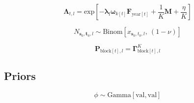 \documentclass{article}
\begin{document}

\begin{equation}
  \label{eq:model-survival}
    \boldsymbol{\Lambda}_{t,l} = 
      \mathrm{exp} \! \left[ -
      \boldsymbol{\lambda}_{l} \boldsymbol{\omega}_{k[t]}  
      \boldsymbol{F}_{\mathrm{year}[t]} + \frac{1}{K} \boldsymbol{M} + \frac{\eta}{K} \right]
\end{equation}


\begin{equation}
  \label{eq:model-release}
  N_{\boldsymbol{s}_{0},\boldsymbol{t}_{0},l} \sim 
    \mathrm{Binom} \! \left[ x_{\boldsymbol{s}_{0},t_{0},l} \mathrm{,} \: \left( 1 - \nu \right) \right]
\end{equation}

\begin{equation}
  \label{eq:model-movement}
  \boldsymbol{P}_{\mathrm{block}[t],l} = \boldsymbol{\Gamma}^{K}_{\mathrm{block}[t],l}
\end{equation}



\subsection{Priors}

\begin{equation}
  \label{eq:prior-dispersion}
  \phi \sim \mathrm{Gamma} \! \left[ \mathrm{val, val} \right]
\end{equation}
\end{document}
